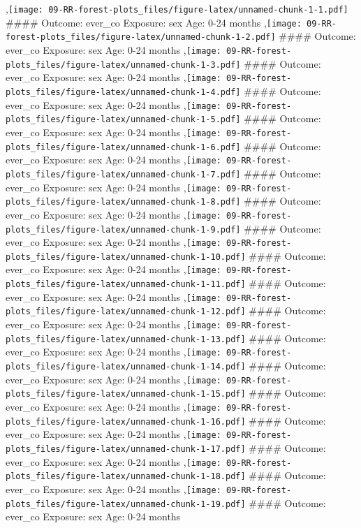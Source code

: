 \documentclass[
  9pt,
]{book}
\begin{document}
,\texttt{[image: 09-RR-forest-plots\_files/figure-latex/unnamed-chunk-1-1.pdf]}
\#\#\#\# Outcome: ever\_co Exposure: sex Age: 0-24 months
,\texttt{[image: 09-RR-forest-plots\_files/figure-latex/unnamed-chunk-1-2.pdf]}
\#\#\#\# Outcome: ever\_co Exposure: sex Age: 0-24 months
,\texttt{[image: 09-RR-forest-plots\_files/figure-latex/unnamed-chunk-1-3.pdf]}
\#\#\#\# Outcome: ever\_co Exposure: sex Age: 0-24 months
,\texttt{[image: 09-RR-forest-plots\_files/figure-latex/unnamed-chunk-1-4.pdf]}
\#\#\#\# Outcome: ever\_co Exposure: sex Age: 0-24 months
,\texttt{[image: 09-RR-forest-plots\_files/figure-latex/unnamed-chunk-1-5.pdf]}
\#\#\#\# Outcome: ever\_co Exposure: sex Age: 0-24 months
,\texttt{[image: 09-RR-forest-plots\_files/figure-latex/unnamed-chunk-1-6.pdf]}
\#\#\#\# Outcome: ever\_co Exposure: sex Age: 0-24 months
,\texttt{[image: 09-RR-forest-plots\_files/figure-latex/unnamed-chunk-1-7.pdf]}
\#\#\#\# Outcome: ever\_co Exposure: sex Age: 0-24 months
,\texttt{[image: 09-RR-forest-plots\_files/figure-latex/unnamed-chunk-1-8.pdf]}
\#\#\#\# Outcome: ever\_co Exposure: sex Age: 0-24 months
,\texttt{[image: 09-RR-forest-plots\_files/figure-latex/unnamed-chunk-1-9.pdf]}
\#\#\#\# Outcome: ever\_co Exposure: sex Age: 0-24 months
,\texttt{[image: 09-RR-forest-plots\_files/figure-latex/unnamed-chunk-1-10.pdf]}
\#\#\#\# Outcome: ever\_co Exposure: sex Age: 0-24 months
,\texttt{[image: 09-RR-forest-plots\_files/figure-latex/unnamed-chunk-1-11.pdf]}
\#\#\#\# Outcome: ever\_co Exposure: sex Age: 0-24 months
,\texttt{[image: 09-RR-forest-plots\_files/figure-latex/unnamed-chunk-1-12.pdf]}
\#\#\#\# Outcome: ever\_co Exposure: sex Age: 0-24 months
,\texttt{[image: 09-RR-forest-plots\_files/figure-latex/unnamed-chunk-1-13.pdf]}
\#\#\#\# Outcome: ever\_co Exposure: sex Age: 0-24 months
,\texttt{[image: 09-RR-forest-plots\_files/figure-latex/unnamed-chunk-1-14.pdf]}
\#\#\#\# Outcome: ever\_co Exposure: sex Age: 0-24 months
,\texttt{[image: 09-RR-forest-plots\_files/figure-latex/unnamed-chunk-1-15.pdf]}
\#\#\#\# Outcome: ever\_co Exposure: sex Age: 0-24 months
,\texttt{[image: 09-RR-forest-plots\_files/figure-latex/unnamed-chunk-1-16.pdf]}
\#\#\#\# Outcome: ever\_co Exposure: sex Age: 0-24 months
,\texttt{[image: 09-RR-forest-plots\_files/figure-latex/unnamed-chunk-1-17.pdf]}
\#\#\#\# Outcome: ever\_co Exposure: sex Age: 0-24 months
,\texttt{[image: 09-RR-forest-plots\_files/figure-latex/unnamed-chunk-1-18.pdf]}
\#\#\#\# Outcome: ever\_co Exposure: sex Age: 0-24 months
,\texttt{[image: 09-RR-forest-plots\_files/figure-latex/unnamed-chunk-1-19.pdf]}
\#\#\#\# Outcome: ever\_co Exposure: sex Age: 0-24 months
\end{document}
